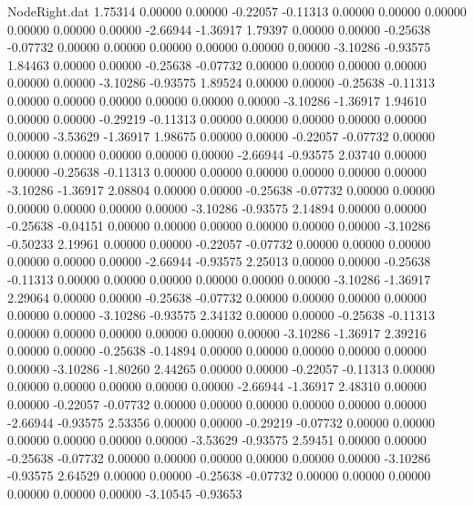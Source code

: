 \begin{filecontents}{NodeRight.dat}
   1.75314    0.00000    0.00000    -0.22057   -0.11313    0.00000    0.00000    0.00000    0.00000    0.00000    0.00000   -2.66944   -1.36917
   1.79397    0.00000    0.00000    -0.25638   -0.07732    0.00000    0.00000    0.00000    0.00000    0.00000    0.00000   -3.10286   -0.93575
   1.84463    0.00000    0.00000    -0.25638   -0.07732    0.00000    0.00000    0.00000    0.00000    0.00000    0.00000   -3.10286   -0.93575
   1.89524    0.00000    0.00000    -0.25638   -0.11313    0.00000    0.00000    0.00000    0.00000    0.00000    0.00000   -3.10286   -1.36917
   1.94610    0.00000    0.00000    -0.29219   -0.11313    0.00000    0.00000    0.00000    0.00000    0.00000    0.00000   -3.53629   -1.36917
   1.98675    0.00000    0.00000    -0.22057   -0.07732    0.00000    0.00000    0.00000    0.00000    0.00000    0.00000   -2.66944   -0.93575
   2.03740    0.00000    0.00000    -0.25638   -0.11313    0.00000    0.00000    0.00000    0.00000    0.00000    0.00000   -3.10286   -1.36917
   2.08804    0.00000    0.00000    -0.25638   -0.07732    0.00000    0.00000    0.00000    0.00000    0.00000    0.00000   -3.10286   -0.93575
   2.14894    0.00000    0.00000    -0.25638   -0.04151    0.00000    0.00000    0.00000    0.00000    0.00000    0.00000   -3.10286   -0.50233
   2.19961    0.00000    0.00000    -0.22057   -0.07732    0.00000    0.00000    0.00000    0.00000    0.00000    0.00000   -2.66944   -0.93575
   2.25013    0.00000    0.00000    -0.25638   -0.11313    0.00000    0.00000    0.00000    0.00000    0.00000    0.00000   -3.10286   -1.36917
   2.29064    0.00000    0.00000    -0.25638   -0.07732    0.00000    0.00000    0.00000    0.00000    0.00000    0.00000   -3.10286   -0.93575
   2.34132    0.00000    0.00000    -0.25638   -0.11313    0.00000    0.00000    0.00000    0.00000    0.00000    0.00000   -3.10286   -1.36917
   2.39216    0.00000    0.00000    -0.25638   -0.14894    0.00000    0.00000    0.00000    0.00000    0.00000    0.00000   -3.10286   -1.80260
   2.44265    0.00000    0.00000    -0.22057   -0.11313    0.00000    0.00000    0.00000    0.00000    0.00000    0.00000   -2.66944   -1.36917
   2.48310    0.00000    0.00000    -0.22057   -0.07732    0.00000    0.00000    0.00000    0.00000    0.00000    0.00000   -2.66944   -0.93575
   2.53356    0.00000    0.00000    -0.29219   -0.07732    0.00000    0.00000    0.00000    0.00000    0.00000    0.00000   -3.53629   -0.93575
   2.59451    0.00000    0.00000    -0.25638   -0.07732    0.00000    0.00000    0.00000    0.00000    0.00000    0.00000   -3.10286   -0.93575
   2.64529    0.00000    0.00000    -0.25638   -0.07732    0.00000    0.00000    0.00000    0.00000    0.00000    0.00000   -3.10545   -0.93653

\end{filecontents}

